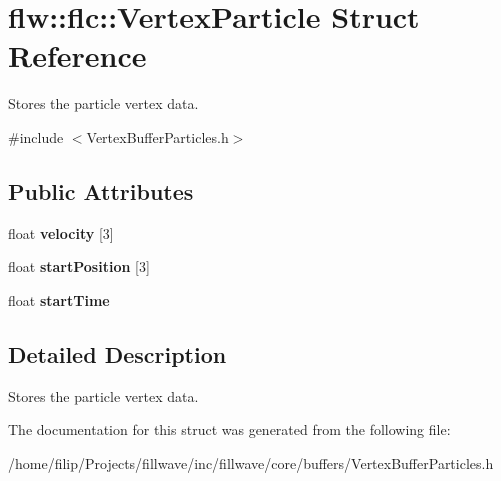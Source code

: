 \hypertarget{structflw_1_1flc_1_1VertexParticle}{}\section{flw\+:\+:flc\+:\+:Vertex\+Particle Struct Reference}
\label{structflw_1_1flc_1_1VertexParticle}


Stores the particle vertex data.  




{\ttfamily \#include $<$Vertex\+Buffer\+Particles.\+h$>$}

\subsection*{Public Attributes}
\begin{DoxyCompactItemize}
\item 
float {\bfseries velocity} \mbox{[}3\mbox{]}\hypertarget{structflw_1_1flc_1_1VertexParticle_ad79a68ef6321fa9ef11a5cb4c954de88}{}\label{structflw_1_1flc_1_1VertexParticle_ad79a68ef6321fa9ef11a5cb4c954de88}

\item 
float {\bfseries start\+Position} \mbox{[}3\mbox{]}\hypertarget{structflw_1_1flc_1_1VertexParticle_a54b9be8e44ee4cbc59de2b1b95bb01fc}{}\label{structflw_1_1flc_1_1VertexParticle_a54b9be8e44ee4cbc59de2b1b95bb01fc}

\item 
float {\bfseries start\+Time}\hypertarget{structflw_1_1flc_1_1VertexParticle_a41542fa766eee4186138b250a9c7a9cf}{}\label{structflw_1_1flc_1_1VertexParticle_a41542fa766eee4186138b250a9c7a9cf}

\end{DoxyCompactItemize}


\subsection{Detailed Description}
Stores the particle vertex data. 

The documentation for this struct was generated from the following file\+:\begin{DoxyCompactItemize}
\item 
/home/filip/\+Projects/fillwave/inc/fillwave/core/buffers/Vertex\+Buffer\+Particles.\+h\end{DoxyCompactItemize}
